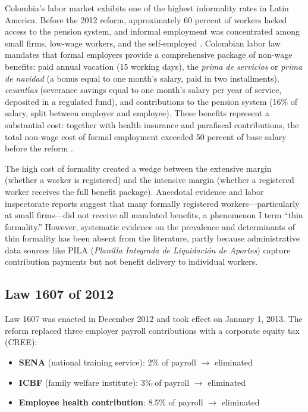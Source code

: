 \documentclass[12pt]{article}
\begin{document}
Colombia's labor market exhibits one of the highest informality rates in Latin America. Before the 2012 reform, approximately 60 percent of workers lacked access to the pension system, and informal employment was concentrated among small firms, low-wage workers, and the self-employed \citep{perry2007informality, bernal2009formal, cardenas2007informality}. Colombian labor law mandates that formal employers provide a comprehensive package of non-wage benefits: paid annual vacation (15 working days), the \textit{prima de servicios} or \textit{prima de navidad} (a bonus equal to one month's salary, paid in two installments), \textit{cesant\'{\i}as} (severance savings equal to one month's salary per year of service, deposited in a regulated fund), and contributions to the pension system (16\% of salary, split between employer and employee). These benefits represent a substantial cost: together with health insurance and parafiscal contributions, the total non-wage cost of formal employment exceeded 50 percent of base salary before the reform \citep{heckman2000effects, kugler2009effects}.

The high cost of formality created a wedge between the extensive margin (whether a worker is registered) and the intensive margin (whether a registered worker receives the full benefit package). Anecdotal evidence and labor inspectorate reports suggest that many formally registered workers---particularly at small firms---did not receive all mandated benefits, a phenomenon I term ``thin formality.'' However, systematic evidence on the prevalence and determinants of thin formality has been absent from the literature, partly because administrative data sources like PILA (\textit{Planilla Integrada de Liquidaci\'{o}n de Aportes}) capture contribution payments but not benefit delivery to individual workers.

\subsection{Law 1607 of 2012}

Law 1607 was enacted in December 2012 and took effect on January 1, 2013. The reform replaced three employer payroll contributions with a corporate equity tax (CREE):

\begin{itemize}
    \item \textbf{SENA} (national training service): 2\% of payroll $\rightarrow$ eliminated
    \item \textbf{ICBF} (family welfare institute): 3\% of payroll $\rightarrow$ eliminated
    \item \textbf{Employee health contribution}: 8.5\% of payroll $\rightarrow$ eliminated
\end{itemize}
\end{document}
